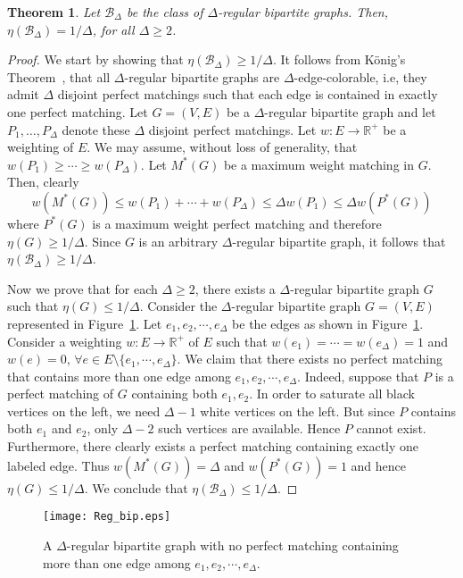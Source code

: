 \documentclass{article}
\newtheorem{thm}{Theorem}
\newcommand{\RE}{\mathbb{R}}			\newcommand{\ZZ}{\mathbb{Z}}			\newcommand{\OO}{\widetilde{O}}
\newcommand{\BB}{\mathcal{B}}
\begin{document}
\begin{thm} \label{lem:lbip}
Let $\BB_\Delta$ be the class of $\Delta$-regular bipartite graphs. Then, $\eta(\BB_\Delta) =1/\Delta$, for all $\Delta\geq 2$.
\end{thm}
\begin{proof}
We start by showing that $\eta(\BB_\Delta)\geq 1/\Delta$. It follows from K\"{o}nig's Theorem~\cite{konig}, that all $\Delta$-regular bipartite graphs are $\Delta$-edge-colorable, i.e, they admit $\Delta$ disjoint perfect matchings such that each edge is contained in exactly one perfect matching. Let $G=(V,E)$ be a $\Delta$-regular bipartite graph and let $P_1,\ldots,P_{\Delta}$ denote these $\Delta$ disjoint perfect matchings. Let $w:E\rightarrow \RE^+$ be a weighting of $E$. We may assume, without loss of generality, that $w(P_1) \geq \cdots \geq w(P_{\Delta})$. Let $M^*(G)$ be a maximum weight matching in $G$. Then, clearly
\[w(M^*(G)) \leq w(P_1) + \cdots + w(P_{\Delta}) \leq \Delta w(P_1) \leq \Delta w(P^{*}(G))\]
where $P^*(G)$ is a maximum weight perfect matching and therefore $\eta(G) \geq 1/\Delta$. Since $G$ is an arbitrary $\Delta$-regular bipartite graph, it follows that $\eta(\BB_\Delta) \geq 1/\Delta$.

Now we prove that for each $\Delta\geq 2$, there exists a $\Delta$-regular bipartite graph $G$ such that $\eta(G) \leq 1/\Delta$. Consider the $\Delta$-regular bipartite graph $G=(V,E)$ represented in Figure~\ref{fig:Reg_bip}. Let $e_1,e_2,\cdots,e_{\Delta}$ be the edges as shown in Figure~\ref{fig:Reg_bip}.
Consider a weighting $w:E\rightarrow \RE^+$ of $E$ such that $w(e_1)=\cdots=w(e_{\Delta})=1$ and $w(e)=0$, $\forall e\in E\setminus \{e_1,\cdots,e_{\Delta}\}$. We claim that there exists no perfect matching that contains more than one edge among $e_1,e_2,\cdots,e_{\Delta}$. Indeed, suppose that $P$ is a perfect matching of $G$ containing both $e_1,e_2$. In order to saturate all black vertices on the left, we need $\Delta-1$ white vertices on the left. But since $P$ contains both $e_1$ and $e_2$, only $\Delta-2$ such vertices are available. Hence $P$ cannot exist. Furthermore, there clearly exists a perfect matching containing exactly one labeled edge. Thus $w(M^*(G))=\Delta$ and $w(P^*(G))=1$ and hence $\eta(G)\leq 1/\Delta$. We conclude that $\eta(\BB_\Delta)\leq 1/\Delta$.
\end{proof}

\begin{figure}[ht]
\centering
\texttt{[image: Reg\_bip.eps]}
\caption{A $\Delta$-regular bipartite graph with no perfect matching containing more than one edge among $e_1,e_2,\cdots,e_{\Delta}$.}
\label{fig:Reg_bip}
\end{figure}
\end{document}
